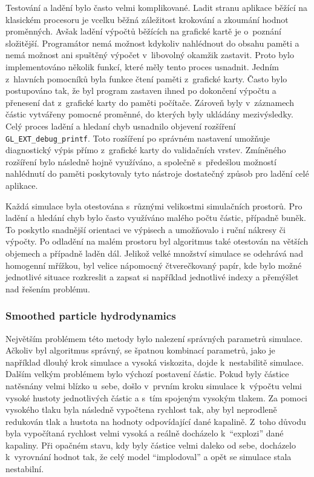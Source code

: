 Testování a ladění bylo často velmi komplikované. Ladit stranu aplikace běžící na klasickém procesoru je vcelku běžná záležitost krokování a zkoumání hodnot proměnných. Avšak ladění výpočtů běžících na grafické kartě je o~poznání složitější. Programátor nemá možnost kdykoliv nahlédnout do obsahu paměti a nemá možnost ani spuštěný výpočet v~libovolný okamžik zastavit. Proto bylo implementováno několik funkcí, které měly tento proces usnadnit. Jedním z~hlavních pomocníků byla funkce čtení paměti z~grafické karty. Často bylo postupováno tak, že byl program zastaven ihned po dokončení výpočtu a přenesení dat z~grafické karty do paměti počítače. Zároveň byly v~záznamech částic vytvářeny pomocné proměnné, do kterých byly ukládány mezivýsledky. Celý proces ladění a hledaní chyb usnadnilo objevení rozšíření \texttt{GL\_EXT\_debug\_printf}. Toto rozšíření po správném nastavení umožňuje diagnostický výpis přímo z~grafické karty do validačních vrstev. Zmíněného rozšíření bylo následně hojně využíváno, a společně s~předešlou možností nahlédnutí do paměti poskytovaly tyto nástroje dostatečný způsob pro ladění celé aplikace.

Každá simulace byla otestována s~různými velikostmi simulačních prostorů. Pro ladění a hledání chyb bylo často využíváno malého počtu částic, případně buněk. To poskytlo snadnější orientaci ve výpisech a umožňovalo i ruční nákresy či výpočty. Po odladění na malém prostoru byl algoritmus také otestován na větších objemech a případně laděn dál. Jelikož velké množství simulace se odehrává nad homogenní mřížkou, byl velice nápomocný čtverečkovaný papír, kde bylo možné jednotlivé situace rozkreslit a zapsat si například jednotlivé indexy a přemýšlet nad řešením problému.

\subsubsection{Smoothed particle hydrodynamics}
Největším problémem této metody bylo nalezení správných parametrů simulace. Ačkoliv byl algoritmus správný, se špatnou kombinací parametrů, jako je například dlouhý krok simulace a vysoká viskozita, dojde k~nestabilitě simulace. Dalším velkým problémem bylo výchozí postavení částic. Pokud byly částice natěsnány velmi blízko u~sebe, došlo v~prvním kroku simulace k~výpočtu velmi vysoké hustoty jednotlivých částic a s~tím spojeným vysokým tlakem. Za pomoci vysokého tlaku byla následně vypočtena rychlost tak, aby byl neprodleně redukován tlak a hustota na hodnoty odpovídající dané kapalině. Z~toho důvodu byla vypočítaná rychlost velmi vysoká a reálně docházelo k~\enquote{explozi} dané kapaliny. Při opačném stavu, kdy byly částice velmi daleko od sebe, docházelo k~vyrovnání hodnot tak, že celý model \enquote{implodoval} a opět se simulace stala nestabilní.

